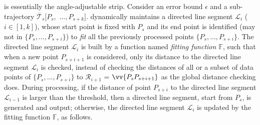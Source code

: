 \subsection{\operb}
\operb\cite{Lin:Operb} is essentially the angle-adjustable strip\cite{Reumann:Strip}.
Consider an error bound $\epsilon$ and a sub-trajectory $\dddot{\mathcal{T}_s}[P_s,$ $\ldots, P_{s+k}]$.
\operb dynamically maintains a directed line segment $\mathcal{L}_i$ ($i\in[1,k]$), whose start point is fixed with $P_s$ and its end point is identified (may not in $\{P_s, \ldots, P_{s+i}\}$) to {\em fit} all the previously processed points $\{P_s, \ldots, P_{s+i}\}$.
The directed line segment $\mathcal{L}_i$ is built by a function named \emph{fitting function $\mathbb{F}$}, such that when a new point $P_{s+i+1}$ is considered, only its distance to the directed line segment $\mathcal{L}_i$ is checked, instead of checking the distances of all or a subset of data points of $\{P_{s}, \ldots, P_{s+i}\}$ to $\mathcal{R}_{i+1}$ = $\vv{P_sP_{s+i+1}}$ as the global distance checking does.
During processing, if the distance of point $P_{s+i}$ to the directed line segment $\mathcal{L}_{i-1}$ is larger than the threshold, then a directed line segment, start from $P_s$, is generated and output;
otherwise, the directed line segment $\mathcal{L}_i$ is updated by the fitting function $\mathbb{F}$, as follows.

